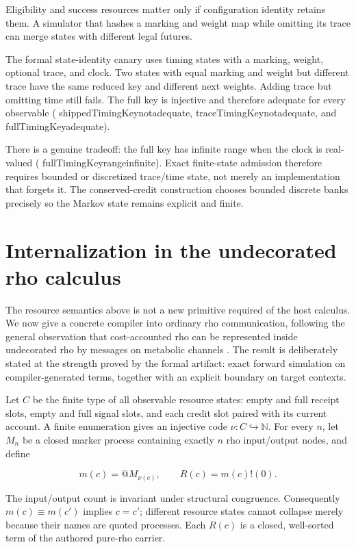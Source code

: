 \documentclass[11pt]{article}
\newcommand{\leanname}[1]{{\scriptsize\ttfamily
  \def\_{\textunderscore\allowbreak}#1}}
\begin{document}
Eligibility and success resources matter only if configuration identity
retains them.  A simulator that hashes a marking and weight map while omitting
its trace can merge states with different legal futures.

The formal state-identity canary uses timing states with a marking, weight,
optional trace, and clock.  Two states with equal marking and weight but
different trace have the same reduced key and different next weights.  Adding
trace but omitting time still fails.  The full key is injective and therefore
adequate for every observable
(\leanname{shippedTimingKey\_not\_adequate},
\leanname{traceTimingKey\_not\_adequate}, and
\leanname{fullTimingKey\_adequate}).

There is a genuine tradeoff: the full key has infinite range when the clock is
real-valued (\leanname{fullTimingKey\_range\_infinite}).  Exact finite-state
admission therefore requires bounded or discretized trace/time state, not
merely an implementation that forgets it.  The conserved-credit construction
chooses bounded discrete banks precisely so the Markov state remains explicit
and finite.

\section{Internalization in the undecorated rho calculus}
\label{sec:rho-internalization}

The resource semantics above is not a new primitive required of the host
calculus.  We now give a concrete compiler into ordinary rho communication,
following the general observation that cost-accounted rho can be represented
inside undecorated rho by messages on metabolic channels
\cite{meredith2026mortal}.  The result is deliberately stated at the strength
proved by the formal artifact: exact forward simulation on compiler-generated
terms, together with an explicit boundary on target contexts.

Let $C$ be the finite type of all observable resource states: empty and full
receipt slots, empty and full signal slots, and each credit slot paired with
its current account.  A finite enumeration gives an injective code
$\nu:C\hookrightarrow\mathbb{N}$.  For every $n$, let $M_n$ be a closed marker
process containing exactly $n$ rho input/output nodes, and define

\[
  m(c)=@M_{\nu(c)}, \qquad R(c)=m(c)!(0).
\]

The input/output count is invariant under structural congruence.  Consequently
$m(c)\equiv m(c')$ implies $c=c'$; different resource states cannot collapse
merely because their names are quoted processes.  Each $R(c)$ is a closed,
well-sorted term of the authored pure-rho carrier.
\end{document}
